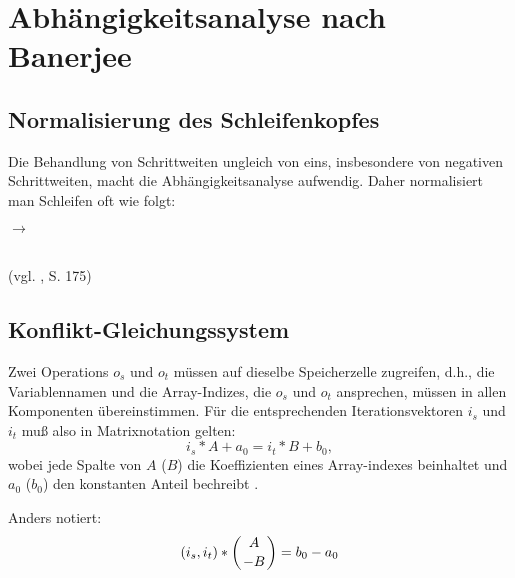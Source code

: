 \setcounter{section}{4}
\section{Abhängigkeitsanalyse nach Banerjee}

\subsection{Normalisierung des Schleifenkopfes}

Die Behandlung von Schrittweiten ungleich von eins, insbesondere von
negativen Schrittweiten, macht die Abhängigkeitsanalyse aufwendig. Daher
normalisiert man Schleifen oft wie folgt:



 
\begin{minipage}{.4\textwidth}
  \begin{algorithm}[H]
  \end{algorithm}
\end{minipage}
\begin{minipage}{.5\textwidth}
    \qquad $\to$ \qquad  
    \begin{algorithm}[H]
      \end{algorithm}  
\end{minipage}
  ~\\
(vgl. \cite{Zima90}, S. 175)

\subsection{Konflikt-Gleichungssystem}

Zwei Operations $o_s$ und $o_t$ müssen auf dieselbe Speicherzelle
zugreifen, d.h., die Variablennamen und die Array-Indizes, die $o_s$ und
$o_t$ ansprechen, müssen in allen Komponenten übereinstimmen. Für die
entsprechenden Iterationsvektoren $i_s$ und $i_t$ muß also in
Matrixnotation gelten: 
$$i_s * A + a_0 = i_t * B + b_0,$$ wobei jede Spalte von $A$ ($B$) die
Koeffizienten eines Array-indexes beinhaltet und $a_0$ ($b_0$) den
konstanten Anteil bechreibt \cite{Ban93}.

Anders notiert: $$(i_s, i_t) * \left( {A \atop -B} \right) = b_0-a_0$$

